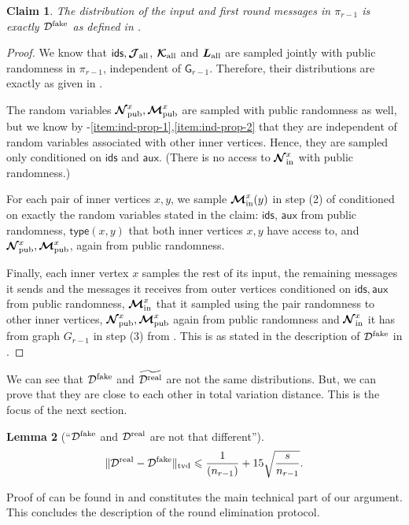 \documentclass[11pt]{article}
\newtheorem{lemma}{Lemma}[section]
\newtheorem{claim}[lemma]{Claim}
\theoremstyle{definition}
\renewcommand{\leq}{\leqslant}
\newcommand{\tvd}[2]{\ensuremath{\norm{#1 - #2}_{\mathrm{tvd}}}}
\newcommand{\norm}[1]{\ensuremath{\|#1\|}}
\newcommand{\rv}[1]{\ensuremath{{\mathsf{#1}}}\xspace}
\newcommand{\prot}{\ensuremath{\pi}}
\newcommand{\rtypeval}[1]{\ensuremath{\rv{type}(#1)}}
\newcommand{\rNinner}[2]{\ensuremath{\bm{\mathcal{N}}_{\textnormal{in}}^{#1_{#2}}}}
\newcommand{\cD}{\ensuremath{\mathcal{D}}}
\newcommand{\cDreal}{\ensuremath{\cD^{\textnormal{real}}}}
\newcommand{\cDrealtil}{\ensuremath{\widetilde{\cDreal}}}
\newcommand{\cDfake}{\ensuremath{\cD^{\textnormal{fake}}}}
\newcommand{\raux}{\ensuremath{\rv{aux}}}
\newcommand{\rcJall}{\ensuremath{\bm{\mathcal{J}}_{\textnormal{all}}}}
\newcommand{\rcKall}{\ensuremath{\bm{\mathcal{K}}_{\textnormal{all}}}}
\newcommand{\rLall}{\ensuremath{\bm{L}_{\textnormal{all}}}}
\newcommand{\rNpub}[1]{\ensuremath{\bm{\mathcal{N}}_{\textnormal{pub}}^{#1}}}
\newcommand{\rMpub}[1]{\ensuremath{\bm{\mathcal{M}}_{\textnormal{pub}}^{#1}}}
\newcommand{\rMinner}[1]{\ensuremath{\bm{\mathcal{M}}_{\textnormal{in}}^{#1}}}
\newcommand{\rG}{\ensuremath{\rv{G}}}
\newcommand{\rids}{\ensuremath{\rv{ids}}}
\begin{document}
\begin{claim}\label{clm:cDfake-prot-r-1}
	The distribution of the input and first round messages in $\prot_{r-1}$ is exactly $\cDfake$ as defined in .
\end{claim}
\begin{proof}
	We know that $\rids, \rcJall$, $\rcKall$ and $\rLall$ are sampled jointly with public randomness in $\prot_{r-1}$, independent of $\rG_{r-1}$. Therefore, their distributions are exactly as given in .
	
	The random variables $\rNpub{x}, \rMpub{x}$ are sampled with public randomness as well, but we know by -\ref{item:ind-prop-1},\ref{item:ind-prop-2} that they are independent of random variables associated with other inner vertices. Hence, they are sampled only conditioned on $\rids$ and $\raux$. (There is no access to $\rNinner{x}{}$ with public randomness.)
	
	For each pair of inner vertices $x, y$, we sample $\rMinner{x}(y)$ in step (2) of  conditioned on exactly the random variables stated in the claim: $\rids$, $\raux$ from public randomness, $\rtypeval{x, y}$ that both inner vertices $x, y$ have access to, and $\rNpub{x}, \rMpub{x}$, again from public randomness. 
	
	Finally, each inner vertex $x$ samples the rest of its input, the remaining messages it sends and the messages it receives from outer vertices conditioned on $\rids, \raux$ from public randomness, $\rMinner{x}$ that it sampled using the pair randomness to other inner vertices, $\rNpub{x}, \rMpub{x}$ again from public randomness and $\rNinner{x}{}$ it has from graph $G_{r-1}$ in step (3) from . This is as stated in the description of $\cDfake$ in .
\end{proof}

We can see that $\cDfake$ and $\cDrealtil$ are not the same distributions. But, we can prove that they are close to each other in total variation distance. This is the focus of the next section. 

\begin{lemma}[``$\cDfake$ and $\cDreal$ are not that different'']\label{lem:round-elim-distance}
\[
	\tvd{\cDreal}{\cDfake} \leq \frac1{(n_{r-1})} + 15 \sqrt{\frac{s}{n_{r-1}}}.
\]
\end{lemma}
Proof of  can be found in  and constitutes the main technical part of our argument. 
This concludes the description of the round elimination protocol. 
\end{document}
